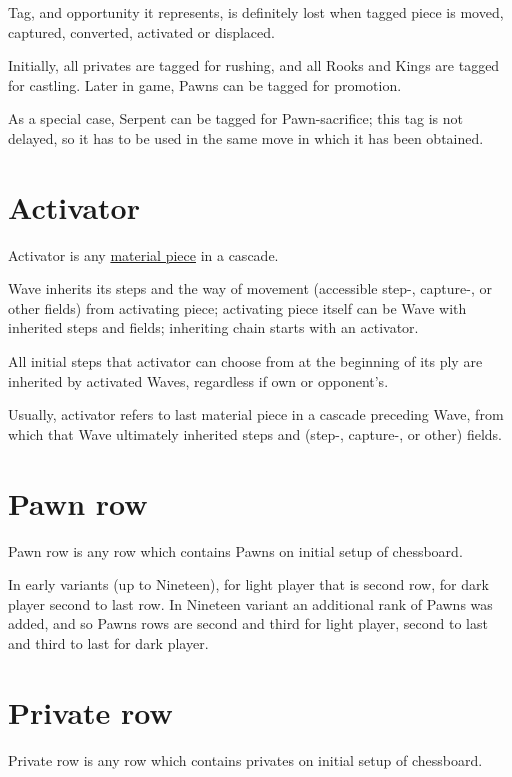 Tag, and opportunity it represents, is definitely lost when tagged piece is moved,
captured, converted, activated or displaced.

Initially, all privates are tagged for rushing, and all Rooks and Kings are tagged
for castling. Later in game, Pawns can be tagged for promotion.

As a special case, Serpent can be tagged for Pawn-sacrifice; this tag is not
delayed, so it has to be used in the same move in which it has been obtained.

\section*{Activator}
\label{sec:Terms/Activator}
Activator is any \hyperref[sec:Terms/Material]{material piece} in a cascade.

Wave inherits its steps and the way of movement (accessible step-, capture-, or
other fields) from activating piece; activating piece itself can be Wave with
inherited steps and fields; inheriting chain starts with an activator.

All initial steps that activator can choose from at the beginning of its ply are
inherited by activated Waves, regardless if own or opponent's.

Usually, activator refers to last material piece in a cascade preceding Wave,
from which that Wave ultimately inherited steps and (step-, capture-, or other)
fields.

\section*{Pawn row}
\label{sec:Terms/Pawn row}
Pawn row is any row which contains Pawns on initial setup of chessboard.

In early variants (up to Nineteen), for light player that is second row, for
dark player second to last row. In Nineteen variant an additional rank of
Pawns was added, and so Pawns rows are second and third for light player,
second to last and third to last for dark player.

\section*{Private row}
\label{sec:Terms/Private row}
Private row is any row which contains privates on initial setup of chessboard.

